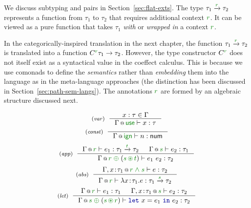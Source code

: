 We discuss subtyping and pairs in Section~\ref{sec:flat-exts}. The type $\tau_1 \xrightarrow{\cclrd{r}} \tau_2$
represents a function from $\tau_1$ to $\tau_2$ that requires additional context $\cclrd{r}$.
It can be viewed as a pure function that takes $\tau_1$ \emph{with} or \emph{wrapped in} a
context $\cclrd{r}$.

In the categorically-inspired translation in the next chapter, the function
$\tau_1 \xrightarrow{\cclrd{r}} \tau_2$ is translated into a function
$C^{\cclrd{r}} \tau_1 \rightarrow \tau_2$. However, the type constructor $C^{\cclrd{r}}$
does not itself exist as a syntactical value in the coeffect calculus. This is because we use
comonads to define the \emph{semantics} rather than \emph{embedding} them into the language as in
the meta-language approaches (the distinction has been discussed in Section~\ref{sec:path-sem-langs}).
The annotations $\cclrd{r}$ are formed by an algebraic structure discussed next.


\begin{figure}[t]
\begin{equation*}
\tyrule{var}
  {x : \tau \in \Gamma}
  {\coctx{\Gamma}{\cunit} \vdash x : \tau }
\end{equation*}
\begin{equation*}
\tyrule{const}
  {~}
  {\coctx{\Gamma}{\czero} \vdash n : \ident{num} }
\end{equation*}
\begin{equation*}
\tyrule{app}
  {\coctx{\Gamma}{\cclrd{r}} \vdash e_1 : \tau_1 \xrightarrow{\cclrd{t}} \tau_2 &
   \coctx{\Gamma}{\cclrd{s}} \vdash e_2 : \tau_1 }
  {\coctx{\Gamma}{\cclrd{r} \;\cpar\; (\cclrd{s} \,\cseq\, \cclrd{t})} \vdash e_1~e_2 : \tau_2}
\end{equation*}
\begin{equation*}
\tyrule{abs}
  {\coctx{\Gamma, x\!:\!\tau_1}{\cclrd{r}\;\czip\;\cclrd{s}} \vdash e : \tau_2}
  {\coctx{\Gamma}{\cclrd{r}} \vdash \lambda x\!:\!\tau_1.e : \tau_1 \xrightarrow{\cclrd{s}} \tau_2 }
\end{equation*}
\begin{equation*}
\tyrule{let}
  { \coctx{\Gamma}{\cclrd{r}} \vdash e_1 : \tau_1 &
    \coctx{\Gamma, x\!:\!\tau_1}{\cclrd{s}} \vdash e_2 : \tau_2}
  {\coctx{\Gamma}{\cclrd{s} \;\cpar\; (\cclrd{s} \,\cseq\, \cclrd{r})} \vdash \kvd{let}~x=e_1~\kvd{in}~e_2 : \tau_2 }
\end{equation*}

\label{fig:flat-types}
\end{figure}

